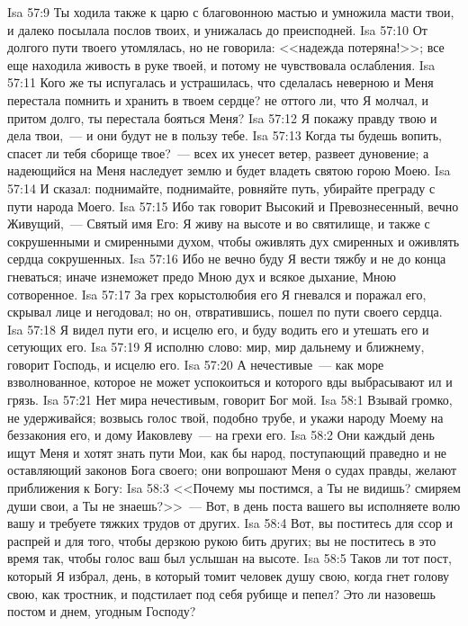 \vs Isa 57:9 Ты ходила также к царю с благовонною мастью и умножила масти твои, и далеко посылала послов твоих, и унижалась до преисподней.
\vs Isa 57:10 От долгого пути твоего утомлялась, но не говорила: <<надежда потеряна!>>; все еще находила живость в руке твоей, и потому не чувствовала ослабления.
\vs Isa 57:11 Кого же ты испугалась и устрашилась, что сделалась неверною и Меня перестала помнить и хранить в твоем сердце? не оттого ли, что Я молчал, и притом долго, ты перестала бояться Меня?
\vs Isa 57:12 Я покажу правду твою и дела твои,~--- и они будут не в пользу тебе.
\vs Isa 57:13 Когда ты будешь вопить, спасет ли тебя сборище твое?~--- всех их унесет ветер, развеет дуновение; а надеющийся на Меня наследует землю и будет владеть святою горою Моею.
\rsbpar\vs Isa 57:14 И сказал: поднимайте, поднимайте, ровняйте путь, убирайте преграду с пути народа Моего.
\vs Isa 57:15 Ибо так говорит Высокий и Превознесенный, вечно Живущий,~--- Святый имя Его: Я живу на высоте  и во святилище, и также с сокрушенными и смиренными духом, чтобы оживлять дух смиренных и оживлять сердца сокрушенных.
\vs Isa 57:16 Ибо не вечно буду Я вести тяжбу и не до конца гневаться; иначе изнеможет предо Мною дух и всякое дыхание, Мною сотворенное.
\vs Isa 57:17 За грех корыстолюбия его Я гневался и поражал его, скрывал лице и негодовал; но он, отвратившись, пошел по пути своего сердца.
\vs Isa 57:18 Я видел пути его, и исцелю его, и буду водить его и утешать его и сетующих его.
\vs Isa 57:19 Я исполню слово: мир, мир дальнему и ближнему, говорит Господь, и исцелю его.
\vs Isa 57:20 А нечестивые~--- как море взволнованное, которое не может успокоиться и которого вды выбрасывают ил и грязь.
\vs Isa 57:21 Нет мира нечестивым, говорит Бог мой.
\vs Isa 58:1 Взывай громко, не удерживайся; возвысь голос твой, подобно трубе, и укажи народу Моему на беззакония его, и дому Иаковлеву~--- на грехи его.
\vs Isa 58:2 Они каждый день ищут Меня и хотят знать пути Мои, как бы народ, поступающий праведно и не оставляющий законов Бога своего; они вопрошают Меня о судах правды, желают приближения к Богу:
\vs Isa 58:3 <<Почему мы постимся, а Ты не видишь? смиряем души свои, а Ты не знаешь?>>~--- Вот, в день поста вашего вы исполняете волю вашу и требуете тяжких трудов от других.
\vs Isa 58:4 Вот, вы поститесь для ссор и распрей и для того, чтобы дерзкою рукою бить других; вы не поститесь в это время так, чтобы голос ваш был услышан на высоте.
\vs Isa 58:5 Таков ли тот пост, который Я избрал, день, в который томит человек душу свою, когда гнет голову свою, как тростник, и подстилает под себя рубище и пепел? Это ли назовешь постом и днем, угодным Господу?
